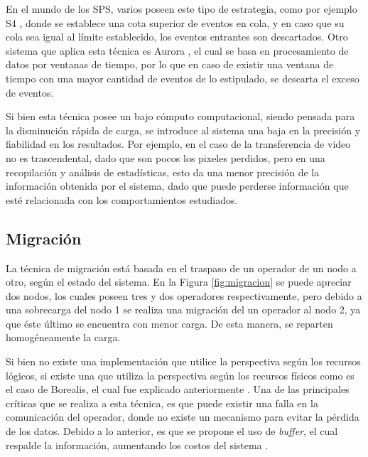 En el mundo de los SPS, varios poseen este tipo de estrategia, como por ejemplo S4 \citep{s4}, donde se establece una cota superior de eventos en cola, y en caso que su cola sea igual al l\'imite establecido, los eventos entrantes son descartados. Otro sistema que aplica esta t\'ecnica es Aurora \citep{aurora}, el cual se basa en procesamiento de datos por ventanas de tiempo, por lo que en caso de existir una ventana de tiempo con una mayor cantidad de eventos de lo estipulado, se descarta el exceso de eventos.

Si bien esta t\'ecnica \normalsize{posee un bajo c\'omputo computacional}, siendo pensada para la disminuci\'on r\'apida de carga, se introduce al sistema una baja en la precisi\'on y fiabilidad en los resultados. Por ejemplo, en el caso de la transferencia de video no es trascendental, dado que son pocos los pixeles perdidos, pero en una recopilaci\'on y an\'alisis de estad\'isticas, esto da una menor precisi\'on de la informaci\'on obtenida por el sistema, dado que puede perderse informaci\'on que est\'e relacionada con los comportamientos estudiados.

\subsection{Migraci\'on}
\label{sec:migracionBC}

La t\'ecnica de migraci\'on est\'a basada en el traspaso de un operador de un nodo a otro, seg\'un el estado del sistema. En la Figura \ref{fig:migracion} se puede apreciar dos nodos, los cuales poseen tres y dos operadores respectivamente, pero debido a una sobrecarga del nodo 1 se realiza una migraci\'on del un operador al nodo 2, ya que \normalsize{\'este \'ultimo} se encuentra con menor carga. De esta manera, se reparten homog\'eneamente la carga.

Si bien no existe una implementaci\'on que utilice la perspectiva seg\'un los recursos l\'ogicos, si existe una que utiliza la perspectiva seg\'un los recursos f\'isicos como es el caso de Borealis, el cual fue explicado anteriormente \citep{XingZH05}. Una de las principales cr\'iticas que se realiza a esta t\'ecnica, es que puede existir una falla en la comunicaci\'on del operador, donde no existe un mecanismo para evitar la p\'erdida de los datos. Debido a lo anterior, es que se propone el uso de \textit{buffer}, el cual respalde la informaci\'on, aumentando los costos del sistema \citep{PittauACA07}.

